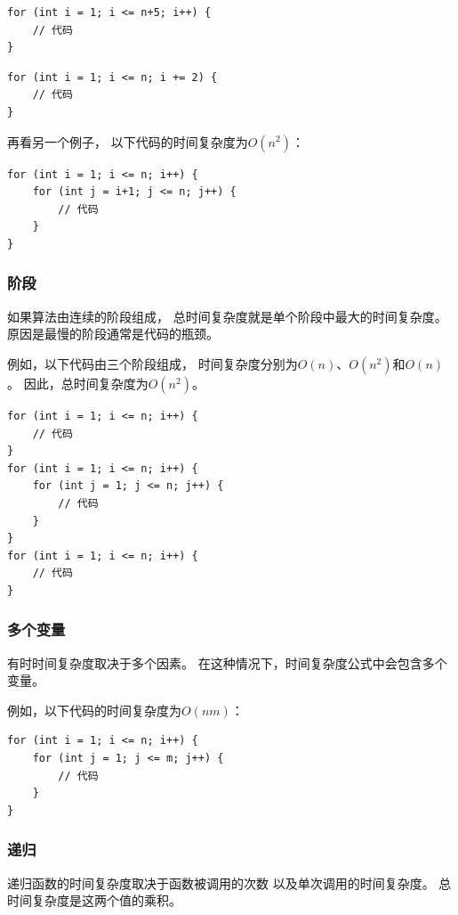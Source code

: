 \begin{lstlisting}
for (int i = 1; i <= n+5; i++) {
    // 代码
}
\end{lstlisting}

\begin{lstlisting}
for (int i = 1; i <= n; i += 2) {
    // 代码
}
\end{lstlisting}

再看另一个例子，
以下代码的时间复杂度为$O(n^2)$：

\begin{lstlisting}
for (int i = 1; i <= n; i++) {
    for (int j = i+1; j <= n; j++) {
        // 代码
    }
}
\end{lstlisting}

\subsubsection*{阶段}

如果算法由连续的阶段组成，
总时间复杂度就是单个阶段中最大的时间复杂度。
原因是最慢的阶段通常是代码的瓶颈。

例如，以下代码由三个阶段组成，
时间复杂度分别为$O(n)$、$O(n^2)$和$O(n)$。
因此，总时间复杂度为$O(n^2)$。

\begin{lstlisting}
for (int i = 1; i <= n; i++) {
    // 代码
}
for (int i = 1; i <= n; i++) {
    for (int j = 1; j <= n; j++) {
        // 代码
    }
}
for (int i = 1; i <= n; i++) {
    // 代码
}
\end{lstlisting}

\subsubsection*{多个变量}

有时时间复杂度取决于多个因素。
在这种情况下，时间复杂度公式中会包含多个变量。

例如，以下代码的时间复杂度为$O(nm)$：

\begin{lstlisting}
for (int i = 1; i <= n; i++) {
    for (int j = 1; j <= m; j++) {
        // 代码
    }
}
\end{lstlisting}

\subsubsection*{递归}

递归函数的时间复杂度取决于函数被调用的次数
以及单次调用的时间复杂度。
总时间复杂度是这两个值的乘积。

